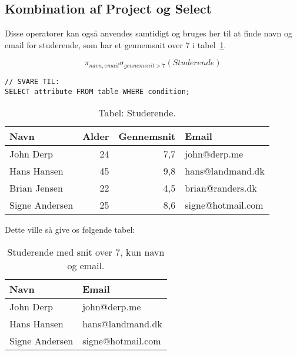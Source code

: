 \subsection{Kombination af Project og Select}

Disse operatorer kan også anvendes samtidigt og bruges her til at finde navn og email for studerende, som har et gennemsnit over 7 i tabel~\ref{tab:stud}.

\begin{equation*}
\pi_{navn, email}\sigma_{gennemsnit>7}(Studerende)
\end{equation*}

\begin{lstlisting}[morekeywords={SELECT, FROM, WHERE}]
// SVARE TIL:
SELECT attribute FROM table WHERE condition;
\end{lstlisting}

\begin{table}[H]
	\centering
	\begin{tabular}{lrrl}
		\toprule
		\textbf{Navn}	&\textbf{Alder}	&\textbf{Gennemsnit}&\textbf{Email}\\
		\midrule
		John Derp		& 24 			& 7,7	& john@derp.me			\\			
		Hans Hansen		& 45 			& 9,8	& hans@landmand.dk		\\			
		Brian Jensen	& 22 			& 4,5	& brian@randers.dk		\\			
		Signe Andersen	& 25 			& 8,6	& signe@hotmail.com		\\
		\bottomrule
	\end{tabular}
	\caption{Tabel: Studerende.}
	\label{tab:stud}
\end{table}

Dette ville så give os følgende tabel:

\begin{table}[H]
	\centering
	\begin{tabular}{ll}
		\toprule
		\textbf{Navn}	& \textbf{Email}	\\
		\midrule
		John Derp		& john@derp.me		\\			
		Hans Hansen		& hans@landmand.dk	\\			
		Signe Andersen	& signe@hotmail.com	\\
		\bottomrule
	\end{tabular}
	\caption{Studerende med snit over 7, kun navn og email.}
\end{table}